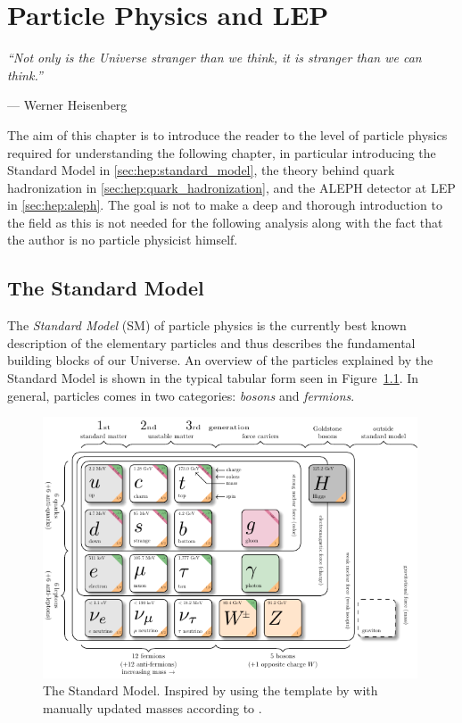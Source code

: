 \FloatBarrier
\chapter{Particle Physics and LEP}
\label{ch:hep:particle_physcis_LEP}
\epigraph{\textit{``Not only is the Universe stranger than we think, it is stranger than we can think.''}}{--- Werner Heisenberg}

The aim of this chapter is to introduce the reader to the level of particle physics required for understanding the following chapter, in particular introducing the Standard Model in \autoref{sec:hep:standard_model}, the theory behind quark hadronization in \autoref{sec:hep:quark_hadronization}, and the ALEPH detector at LEP in \autoref{sec:hep:aleph}. The goal is not to make a deep and thorough introduction to the field as this is not needed for the following analysis  along with the fact that the author is no particle physicist himself. 


\FloatBarrier
\section{The Standard Model}
\label{sec:hep:standard_model}

The \emph{Standard Model} (SM) \autocite{glashowPartialsymmetriesWeakInteractions1961,salamWeakElectromagneticInteractions1994,weinbergModelLeptons1967} of particle physics is the currently best known description of the elementary particles and thus describes the fundamental building blocks of our Universe. An overview of the particles explained by the Standard Model is shown in the typical tabular form seen in Figure~\ref{fig:hep:standard_model}. In general, particles comes in two categories: \emph{bosons} and \emph{fermions}. 

\begin{figure}
  \centerfloat
  \includegraphics[width=0.99\textwidth]{figures/standard_model/sm.pdf}
  \caption[The Standard Model]{The Standard Model. Inspired by \citet{purcellGoParticleQuest2012} using the template by \citet{burgardStandardModelPhysics} with manually updated masses according to \citet{particledatagroupReviewParticlePhysics2018}.}
  \label{fig:hep:standard_model}
\end{figure}

